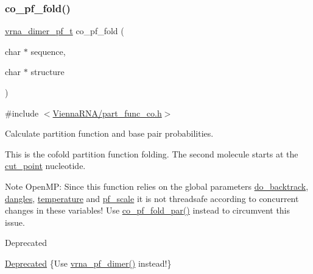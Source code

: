 \subsubsection{\texorpdfstring{co\_pf\_fold()}{co\_pf\_fold()}}
{\footnotesize\ttfamily \mbox{\hyperlink{group__pf__cofold_ga444df1587c9a2ca15b8eb25188f629c3}{vrna\+\_\+dimer\+\_\+pf\+\_\+t}} co\+\_\+pf\+\_\+fold (\begin{DoxyParamCaption}\item[{char $\ast$}]{sequence,  }\item[{char $\ast$}]{structure }\end{DoxyParamCaption})}



{\ttfamily \#include $<$\mbox{\hyperlink{part__func__co_8h}{Vienna\+R\+N\+A/part\+\_\+func\+\_\+co.\+h}}$>$}



Calculate partition function and base pair probabilities. 

This is the cofold partition function folding. The second molecule starts at the \mbox{\hyperlink{fold__vars_8h_ab9b2c3a37a5516614c06d0ab54b97cda}{cut\+\_\+point}} nucleotide.

\begin{DoxyNote}{Note}
Open\+MP\+: Since this function relies on the global parameters \mbox{\hyperlink{group__model__details_gad512b5dd4dbec60faccfe137bb474489}{do\+\_\+backtrack}}, \mbox{\hyperlink{group__model__details_ga72b511ed1201f7e23ec437e468790d74}{dangles}}, \mbox{\hyperlink{group__model__details_gab4b11c8d9c758430960896bc3fe82ead}{temperature}} and \mbox{\hyperlink{group__model__details_gad3b22044065acc6dee0af68931b52cfd}{pf\+\_\+scale}} it is not threadsafe according to concurrent changes in these variables! Use \mbox{\hyperlink{group__part__func__global__deprecated_gaabfc6cb6d02b8f08ac4c92f4f5b125d9}{co\+\_\+pf\+\_\+fold\+\_\+par()}} instead to circumvent this issue.
\end{DoxyNote}
\begin{DoxyRefDesc}{Deprecated}
\item[\mbox{\hyperlink{deprecated__deprecated000112}{Deprecated}}]\{Use \mbox{\hyperlink{group__part__func__global_ga4e5c7d06c302a7c59fc0d64dc142ca63}{vrna\+\_\+pf\+\_\+dimer()}} instead!\}\end{DoxyRefDesc}



